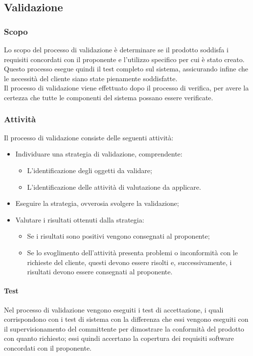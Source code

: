 \documentclass[../norme-di-progetto.tex]{subfiles}
\begin{document}
\subsection{Validazione}
\subsubsection{Scopo}
Lo scopo del processo di validazione è determinare se il prodotto soddisfa i requisiti concordati con il proponente e l'utilizzo specifico per cui è stato creato. Questo processo esegue quindi il test completo sul sistema, assicurando infine che le necessità del cliente siano state pienamente soddisfatte. \\ Il processo di validazione viene effettuato dopo il processo di verifica, per avere la certezza che tutte le componenti del sistema possano essere verificate.
\subsubsection{Attività}
Il processo di validazione consiste delle seguenti attività:
\begin{itemize}
  \item Individuare una strategia di validazione, comprendente:
  \begin{itemize}
    \item L'identificazione degli oggetti da validare;
    \item L'identificazione delle attività di valutazione da applicare.
  \end{itemize}
  \item Eseguire la strategia, ovverosia svolgere la validazione;
  \item Valutare i risultati ottenuti dalla strategia:
  \begin{itemize}
    \item Se i risultati sono positivi vengono consegnati al proponente;
    \item Se lo svoglimento dell'attività presenta problemi o inconformità con le richieste del cliente, questi devono essere risolti e, successivamente, i risultati devono essere consegnati al proponente.
  \end{itemize}
\end{itemize}
\paragraph{Test}
Nel processo di validazione vengono eseguiti i test di accettazione, i quali corrispondono con i test di sistema con la differenza che essi vengono eseguiti con il supervisionamento del committente per dimostrare la conformità del prodotto con quanto richiesto; essi quindi accertano la copertura dei requisiti software concordati con il proponente.
\end{document}
